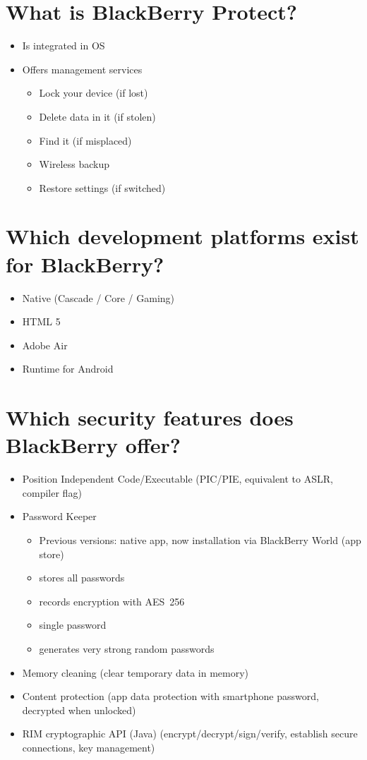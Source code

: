 \documentclass[twocolumn]{article}
\newcommand{\question}[1]{\section{#1}}
\begin{document}
\question{What is BlackBerry Protect?}
%
\begin{itemize}
  \item Is integrated in OS
  \item Offers management services
    \begin{itemize}
      \item Lock your device (if lost)
      \item Delete data in it (if stolen)
      \item Find it (if misplaced)
      \item Wireless backup
      \item Restore settings (if switched)
    \end{itemize}
\end{itemize}

\question{Which development platforms exist for BlackBerry?}
%
\begin{itemize}
  \item Native (Cascade / Core / Gaming)
  \item HTML 5
  \item Adobe Air
  \item Runtime for Android
\end{itemize}

\question{Which security features does BlackBerry offer?}
%
\begin{itemize}
  \item Position Independent Code/Executable (PIC/PIE, equivalent to ASLR, compiler flag)
  \item Password Keeper
    \begin{itemize}
      \item Previous versions: native app, now installation via BlackBerry World (app store)
      \item stores all passwords
      \item records encryption with AES~256
      \item single password
      \item generates very strong random passwords
    \end{itemize}
  \item Memory cleaning (clear temporary data in memory)
  \item Content protection (app data protection with smartphone password, decrypted when unlocked)
  \item RIM cryptographic API (Java) (encrypt/decrypt/sign/verify, establish secure connections, key management)
\end{itemize}
\end{document}
